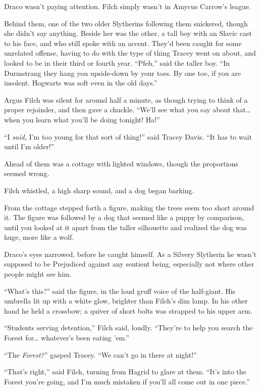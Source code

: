Draco wasn't paying attention. Filch simply wasn't in Amycus Carrow's
league.

Behind them, one of the two older Slytherins following them snickered,
though she didn't say anything. Beside her was the other, a tall boy
with an Slavic cast to his face, and who still spoke with an accent.
They'd been caught for some unrelated offense, having to do with the
type of thing Tracey went on about, and looked to be in their third or
fourth year. ``Pfeh,'' said the taller boy. ``In Durmstrang they hang
you upside-down by your toes. By one toe, if you are insolent. Hogwarts
was soft even in the old days.''

Argus Filch was silent for around half a minute, as though trying to
think of a proper rejoinder, and then gave a chuckle. ``We'll see what
you say about that\ldots{} when you learn what you'll be doing tonight!
Ha!''

``I \emph{said,} I'm too young for that sort of thing!'' said Tracey
Davis. ``It has to wait until I'm older!''

Ahead of them was a cottage with lighted windows, though the proportions
seemed wrong.

Filch whistled, a high sharp sound, and a dog began barking.

From the cottage stepped forth a figure, making the trees seem too short
around it. The figure was followed by a dog that seemed like a puppy by
comparison, until you looked at it apart from the taller silhouette and
realized the dog was huge, more like a wolf.

Draco's eyes narrowed, before he caught himself. As a Silvery Slytherin
he wasn't supposed to be Prejudiced against any sentient being,
especially not where other people might see him.

``What's this?'' said the figure, in the loud gruff voice of the
half-giant. His umbrella lit up with a white glow, brighter than Filch's
dim lamp. In his other hand he held a crossbow; a quiver of short bolts
was strapped to his upper arm.

``Students serving detention,'' Filch said, loudly. ``They're to help
you search the Forest for\ldots{} whatever's been eating 'em.''

``The \emph{Forest?}'' gasped Tracey. ``We can't go in there at night!''

``That's right,'' said Filch, turning from Hagrid to glare at them.
``It's into the Forest you're going, and I'm much mistaken if you'll all
come out in one piece.''

